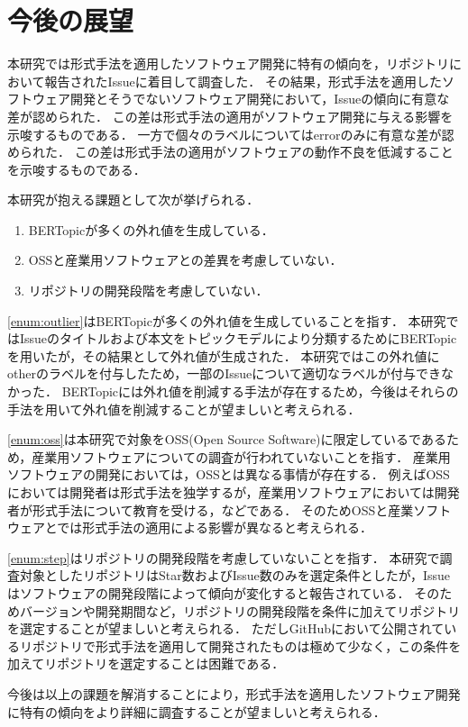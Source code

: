 \documentclass[main]{subfiles}
\begin{document}
\chapter{今後の展望}

本研究では形式手法を適用したソフトウェア開発に特有の傾向を，リポジトリにおいて報告されたIssueに着目して調査した．
その結果，形式手法を適用したソフトウェア開発とそうでないソフトウェア開発において，Issueの傾向に有意な差が認められた．
この差は形式手法の適用がソフトウェア開発に与える影響を示唆するものである．
一方で個々のラベルについてはerrorのみに有意な差が認められた．
この差は形式手法の適用がソフトウェアの動作不良を低減することを示唆するものである．

本研究が抱える課題として次が挙げられる．

\begin{enumerate}[label=課題\arabic*.]
	\item \label{enum:outlier} BERTopicが多くの外れ値を生成している．
	\item \label{enum:oss} OSSと産業用ソフトウェアとの差異を考慮していない．
	\item \label{enum:step} リポジトリの開発段階を考慮していない．
\end{enumerate}

\ref{enum:outlier}はBERTopicが多くの外れ値を生成していることを指す．
本研究ではIssueのタイトルおよび本文をトピックモデルにより分類するためにBERTopicを用いたが，その結果として外れ値が生成された．
本研究ではこの外れ値にotherのラベルを付与したため，一部のIssueについて適切なラベルが付与できなかった．
BERTopicには外れ値を削減する手法が存在するため，今後はそれらの手法を用いて外れ値を削減することが望ましいと考えられる．

\ref{enum:oss}は本研究で対象をOSS(Open Source Software)に限定しているであるため，産業用ソフトウェアについての調査が行われていないことを指す．
産業用ソフトウェアの開発においては，OSSとは異なる事情が存在する．
例えばOSSにおいては開発者は形式手法を独学するが，産業用ソフトウェアにおいては開発者が形式手法について教育を受ける，などである．
そのためOSSと産業ソフトウェアとでは形式手法の適用による影響が異なると考えられる．

\ref{enum:step}はリポジトリの開発段階を考慮していないことを指す．
本研究で調査対象としたリポジトリはStar数およびIssue数のみを選定条件としたが，Issueはソフトウェアの開発段階によって傾向が変化すると報告されている\cite{bissyande:2013}．
そのためバージョンや開発期間など，リポジトリの開発段階を条件に加えてリポジトリを選定することが望ましいと考えられる．
ただしGitHubにおいて公開されているリポジトリで形式手法を適用して開発されたものは極めて少なく，この条件を加えてリポジトリを選定することは困難である．

今後は以上の課題を解消することにより，形式手法を適用したソフトウェア開発に特有の傾向をより詳細に調査することが望ましいと考えられる．
\end{document}
